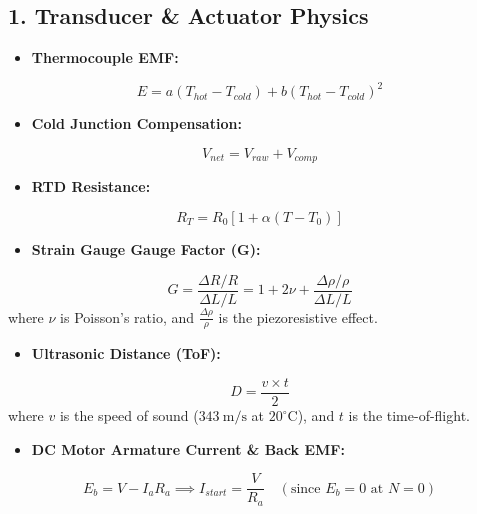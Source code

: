 \subsection{1. Transducer \& Actuator Physics}
\begin{itemize}
  \item \textbf{Thermocouple EMF:}
\end{itemize}
  \[ E = a(T_{hot} - T_{cold}) + b(T_{hot} - T_{cold})^2 \]
\begin{itemize}
  \item \textbf{Cold Junction Compensation:}
\end{itemize}
  \[ V_{net} = V_{raw} + V_{comp} \]
\begin{itemize}
  \item \textbf{RTD Resistance:}
\end{itemize}
  \[ R_T = R_0 [1 + \alpha(T - T_0)] \]
\begin{itemize}
  \item \textbf{Strain Gauge Gauge Factor (G):}
\end{itemize}
  \[ G = \frac{\Delta R/R}{\Delta L/L} = 1 + 2\nu + \frac{\Delta\rho/\rho}{\Delta L/L} \]
  where $\nu$ is Poisson's ratio, and $\frac{\Delta\rho}{\rho}$ is the piezoresistive effect.
\begin{itemize}
  \item \textbf{Ultrasonic Distance (ToF):}
\end{itemize}
  \[ D = \frac{v \times t}{2} \]
  where $v$ is the speed of sound ($343\ \text{m/s}$ at $20^\circ\text{C}$), and $t$ is the time-of-flight.
\begin{itemize}
  \item \textbf{DC Motor Armature Current \& Back EMF:}
\end{itemize}
  \[ E_b = V - I_a R_a \implies I_{start} = \frac{V}{R_a} \quad (\text{since } E_b = 0 \text{ at } N=0) \]

